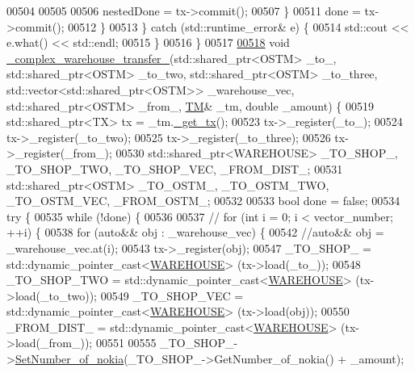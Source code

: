 \begin{DoxyCode}
00504 
00505 
00506                 nestedDone = tx->commit();
00507             \}
00511             done = tx->commit();
00512         \}
00513     \} \textcolor{keywordflow}{catch} (std::runtime\_error& e) \{
00514         std::cout << e.what() << std::endl;
00515     \}
00516 \}
00517 
\hypertarget{main_8cpp_source.tex_l00518}{}\hyperlink{main_8cpp_a12500f2bcc3c3bb8ad7dd9d74c1637d1_a12500f2bcc3c3bb8ad7dd9d74c1637d1}{00518} \textcolor{keywordtype}{void} \hyperlink{main_8cpp_a12500f2bcc3c3bb8ad7dd9d74c1637d1_a12500f2bcc3c3bb8ad7dd9d74c1637d1}{\_complex\_warehouse\_transfer\_}(std::shared\_ptr<OSTM> \_to\_, 
      std::shared\_ptr<OSTM> \_to\_two, std::shared\_ptr<OSTM> \_to\_three, std::vector<std::shared\_ptr<OSTM>> \_warehouse\_vec, 
      std::shared\_ptr<OSTM> \_from\_, \hyperlink{class_t_m}{TM}& \_tm, \textcolor{keywordtype}{double} \_amount) \{
00519     std::shared\_ptr<TX> tx = \_tm.\hyperlink{class_t_m_a41cb0226cc4080c931651b13f74a0075_a41cb0226cc4080c931651b13f74a0075}{\_get\_tx}();
00523     tx->\_register(\_to\_);
00524     tx->\_register(\_to\_two);
00525     tx->\_register(\_to\_three);
00526     tx->\_register(\_from\_);
00530     std::shared\_ptr<WAREHOUSE> \_TO\_SHOP\_, \_TO\_SHOP\_TWO, \_TO\_SHOP\_VEC, \_FROM\_DIST\_;
00531     std::shared\_ptr<OSTM> \_TO\_OSTM\_, \_TO\_OSTM\_TWO, \_TO\_OSTM\_VEC, \_FROM\_OSTM\_;
00532 
00533     \textcolor{keywordtype}{bool} done = \textcolor{keyword}{false};
00534     \textcolor{keywordflow}{try} \{
00535         \textcolor{keywordflow}{while} (!done) \{
00536 
00537             \textcolor{comment}{// for (int i = 0; i < vector\_number; ++i) \{}
00538             \textcolor{keywordflow}{for} (\textcolor{keyword}{auto}&& obj : \_warehouse\_vec) \{
00542                 \textcolor{comment}{//auto&& obj = \_warehouse\_vec.at(i);}
00543                 tx->\_register(obj);
00547                 \_TO\_SHOP\_ = std::dynamic\_pointer\_cast<\hyperlink{class_w_a_r_e_h_o_u_s_e}{WAREHOUSE}> (tx->load(\_to\_));
00548                 \_TO\_SHOP\_TWO = std::dynamic\_pointer\_cast<\hyperlink{class_w_a_r_e_h_o_u_s_e}{WAREHOUSE}> (tx->load(\_to\_two));
00549                 \_TO\_SHOP\_VEC = std::dynamic\_pointer\_cast<\hyperlink{class_w_a_r_e_h_o_u_s_e}{WAREHOUSE}> (tx->load(obj));
00550                 \_FROM\_DIST\_ = std::dynamic\_pointer\_cast<\hyperlink{class_w_a_r_e_h_o_u_s_e}{WAREHOUSE}> (tx->load(\_from\_));
00551 
00555                 \_TO\_SHOP\_->\hyperlink{class_w_a_r_e_h_o_u_s_e_a300d1fe21a47e45c0d5d27e25add346f_a300d1fe21a47e45c0d5d27e25add346f}{SetNumber\_of\_nokia}(\_TO\_SHOP\_->GetNumber\_of\_nokia() + \_amount);

\end{DoxyCode}
